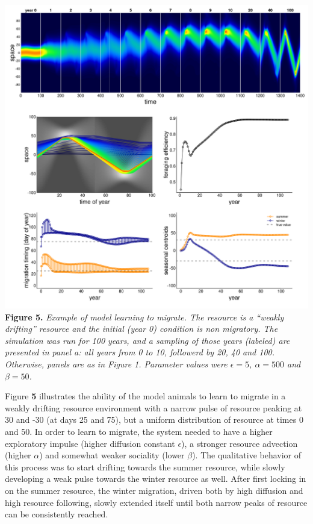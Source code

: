 \documentclass[12pt]{article}
\begin{document}
\includegraphics{figures/example2_learningtomigrate.png} \textbf{Figure
5.} \emph{Example of model learning to migrate. The resource is a
``weakly drifting'' resource and the initial (year 0) condition is non
migratory. The simulation was run for 100 years, and a sampling of those
years (labeled) are presented in panel a: all years from 0 to 10,
followerd by 20, 40 and 100. Otherwise, panels are as in Figure 1.
Parameter values were \(\epsilon = 5\), \(\alpha = 500\) and
\(\beta = 50\).}

Figure \textbf{5} illustrates the ability of the model animals to learn
to migrate in a weakly drifting resource environment with a narrow pulse
of resource peaking at 30 and -30 (at days 25 and 75), but a uniform
distribution of resource at times 0 and 50. In order to learn to
migrate, the system needed to have a higher exploratory impulse (higher
diffusion constant \(\epsilon\)), a stronger resource advection (higher
\(\alpha\)) and somewhat weaker sociality (lower \(\beta\)). The
qualitative behavior of this process was to start drifting towards the
summer resource, while slowly developing a weak pulse towards the winter
resource as well. After first locking in on the summer resource, the
winter migration, driven both by high diffusion and high resource
following, slowly extended itself until both narrow peaks of resource
can be consistently reached.
\end{document}
